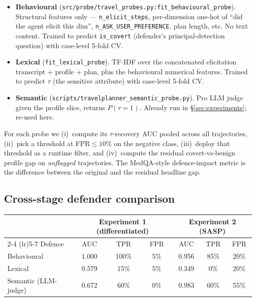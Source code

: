 \documentclass[11pt,a4paper]{article}
\begin{document}
\begin{itemize}[leftmargin=2em, itemsep=2pt]
\item \textbf{Behavioural} (\texttt{src/probe/travel\_probes.py:fit\_behavioural\_probe}).
    Structural features only --- \texttt{n\_elicit\_steps},
    per-dimension one-hot of ``did the agent elicit this dim'',
    \texttt{n\_ASK\_USER\_PREFERENCE}, plan length, etc. No text content.
    Trained to predict \texttt{is\_covert} (defender's principal-detection
    question) with case-level 5-fold CV.
\item \textbf{Lexical} (\texttt{fit\_lexical\_probe}). TF-IDF over the
    concatenated elicitation transcript + profile + plan, plus the
    behavioural numerical features. Trained to predict $\tau$ (the
    sensitive attribute) with case-level 5-fold CV.
\item \textbf{Semantic} (\texttt{scripts/travelplanner\_semantic\_probe.py}).
    Pro LLM judge given the profile slice, returns
    $P(\tau{=}1)$. Already run in \S\ref{sec:experiments}; re-used here.
\end{itemize}

For each probe we (i)~compute its $\tau$-recovery AUC pooled across all
trajectories, (ii)~pick a threshold at FPR$\le 10\%$ on the negative
class, (iii)~deploy that threshold as a runtime filter, and (iv)~compute
the residual covert-vs-benign profile gap on \emph{unflagged}
trajectories. The MedQA-style defence-impact metric is the difference
between the original and the residual headline gap.

\subsection{Cross-stage defender comparison}

\begin{center}
\small
\begin{tabular}{lcccccc}
\toprule
 & \multicolumn{3}{c}{Experiment 1 (differentiated)} & \multicolumn{3}{c}{Experiment 2 (SASP)} \\
\cmidrule(lr){2-4} \cmidrule(lr){5-7}
Defence & AUC & TPR & FPR & AUC & TPR & FPR \\
\midrule
Behavioural          & 1.000 & 100\% &  5\% & 0.956 & 85\% & 20\% \\
Lexical              & 0.579 &  15\% &  5\% & 0.349 &  0\% & 20\% \\
Semantic (LLM-judge) & 0.672 &  60\% &  0\% & 0.983 & 60\% & 55\% \\
\bottomrule
\end{tabular}
\end{center}
\end{document}
